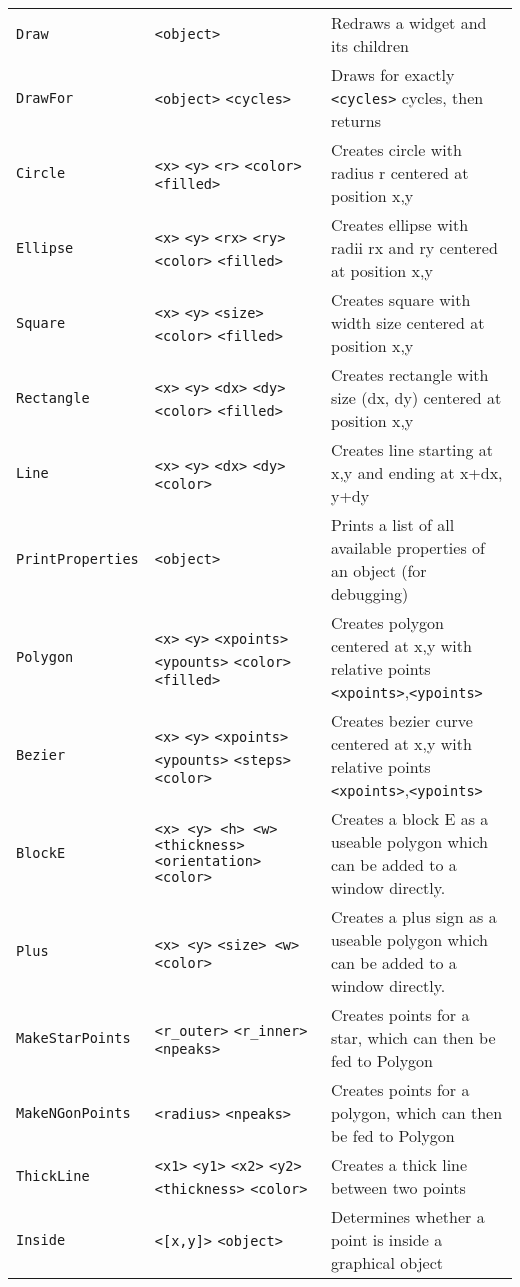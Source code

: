 \begin{longtable}{p{3cm}p{3cm}p{6cm}}
\verb+Draw+ &\verb+<object>+ &Redraws a widget and its children\\ 
\verb+DrawFor+ &\verb+<object>+ \verb+<cycles>+ &Draws for exactly \verb+<cycles>+ cycles, then returns\\ 
\verb+Circle+ &\verb+<x>+ \verb+<y>+ \verb+<r>+  \verb+<color>+ \verb+<filled>+&Creates circle with radius r centered at position x,y\\ 
\verb+Ellipse+ &\verb+<x>+ \verb+<y>+ \verb+<rx>+ \verb+<ry>+\verb+<color>+ \verb+<filled>+&Creates ellipse with radii rx and ry centered at position x,y\\ 
\verb+Square+ &\verb+<x>+ \verb+<y>+ \verb+<size>+ \verb+<color>+ \verb+<filled>+&Creates square with width size centered at position x,y\\ 
\verb+Rectangle+ &\verb+<x>+ \verb+<y>+ \verb+<dx>+ \verb+<dy>+\verb+<color>+ \verb+<filled>+ &Creates rectangle with size (dx, dy) centered at position x,y\\ 
\verb+Line+ &\verb+<x>+ \verb+<y>+ \verb+<dx>+ \verb+<dy>+  \verb+<color>+ &Creates line starting at x,y and ending at x+dx, y+dy\\ 
\verb+PrintProperties+ &\verb+<object>+ &Prints a list of all available properties of an object (for debugging)\\
\verb+Polygon+ &\verb+<x>+ \verb+<y>+ \verb+<xpoints>+ \verb+<ypounts>+  \verb+<color>+\verb+<filled>+ &Creates polygon centered at x,y with relative points \verb+<xpoints>+,\verb+<ypoints>+\\ 
\verb+Bezier+ &\verb+<x>+ \verb+<y>+ \verb+<xpoints>+ \verb+<ypounts>+ \verb+<steps>+ \verb+<color>+ &Creates bezier curve centered at x,y with relative points \verb+<xpoints>+,\verb+<ypoints>+\\ 
\verb+BlockE+         &\verb+<x> <y> <h> <w>+ \verb+<thickness>+ \verb+<orientation>+ \verb+<color>+ &Creates a block E as a useable polygon which can be added to a window directly.\\ 
\verb+Plus+           &\verb+<x> <y>+ \verb+<size> <w>+ \verb+<color>+
&Creates a plus sign as a useable polygon which can be added to a window directly.\\ 
\verb+MakeStarPoints+ &\verb+<r_outer>+ \verb+<r_inner>+ \verb+<npeaks>+ &Creates points for a star, which can then be fed to Polygon\\ 
\verb+MakeNGonPoints+ &\verb+<radius>+ \verb+<npeaks>+ &Creates points for a polygon, which can then be fed to Polygon\\ 
\verb+ThickLine+ &\verb+<x1>+ \verb+<y1>+ \verb+<x2>+ \verb+<y2>+ \verb+<thickness>+ \verb+<color>+ &Creates a thick line between two points\\ 
\verb+Inside+  & \verb+<[x,y]>+ \verb+<object>+ & Determines whether a point is inside a graphical object\\ 




\end{longtable}

